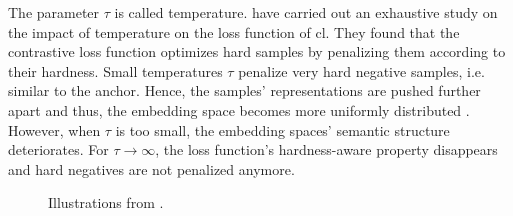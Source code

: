 
The parameter $\tau$ is called temperature.
\citet{CL_temp_2021} have carried out an exhaustive study on the impact of temperature on the loss function of \ac{cl}.
They found that the contrastive loss function optimizes hard samples by penalizing them according to their hardness.
Small temperatures $\tau$ penalize very hard negative samples, i.e. similar to the anchor.
Hence, the samples' representations are pushed further apart and thus, the embedding space becomes more uniformly distributed \citet{CL_temp_2021,grape_2024}.
However, when $\tau$ is too small, the embedding spaces' semantic structure deteriorates.
For $\tau \rightarrow \infty$, the loss function's hardness-aware property disappears and hard negatives are not penalized anymore.


\begin{figure}%
    \centering
    \qquad
    \caption{Illustrations from \citet{CL_temp_2021}.}%
    \label{fig:temperature}%
\end{figure}


